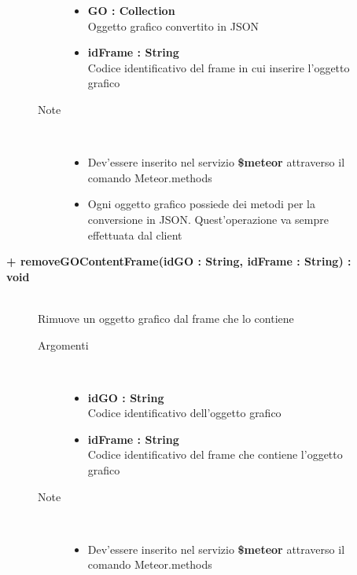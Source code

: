 \begin{description}
\begin{description}
\begin{description}
\begin{itemize}
					\item \textbf{GO : Collection			} \hfill \\
					Oggetto grafico convertito in JSON
					\item \textbf{idFrame : String		} \hfill \\
					Codice identificativo del frame in cui inserire l'oggetto grafico
					
					
				\end{itemize}
			\item[Note] \hfill \\
			\begin{itemize}
					\item Dev'essere inserito nel servizio \textbf{\$meteor} attraverso il comando Meteor.methods
					\item Ogni oggetto grafico possiede dei metodi per la conversione in JSON. Quest'operazione va sempre effettuata dal client
				\end{itemize}
		\end{description}
	\end{description}
	
	\begin{description}
		\item[\textbf{\color{blue}+ removeGOContentFrame(idGO : String, idFrame : String) : void			}] \hfill \\
			Rimuove un oggetto grafico dal frame che lo contiene
			
		\begin{description}
			\item[Argomenti] \hfill \\
				\begin{itemize}
				
					\item \textbf{idGO : String		} \hfill \\
					Codice identificativo dell'oggetto grafico
					\item \textbf{idFrame : String		} \hfill \\
					Codice identificativo del frame che contiene l'oggetto grafico
					
				\end{itemize}
			\item[Note] \hfill \\
			\begin{itemize}
					\item Dev'essere inserito nel servizio \textbf{\$meteor} attraverso il comando Meteor.methods
				\end{itemize}
		\end{description}
	\end{description}
	

\end{description}
